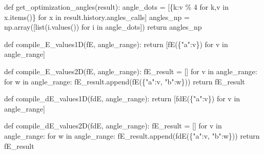 \documentclass[
  letterpaper,
  DIV=11,
  numbers=noendperiod]{scrartcl}
\newenvironment{Shaded}{\begin{snugshade}}{\end{snugshade}}
\newcommand{\BuiltInTok}[1]{\textcolor[rgb]{0.00,0.23,0.31}{#1}}
\newcommand{\ControlFlowTok}[1]{\textcolor[rgb]{0.00,0.23,0.31}{#1}}
\newcommand{\DecValTok}[1]{\textcolor[rgb]{0.68,0.00,0.00}{#1}}
\newcommand{\KeywordTok}[1]{\textcolor[rgb]{0.00,0.23,0.31}{#1}}
\newcommand{\NormalTok}[1]{\textcolor[rgb]{0.00,0.23,0.31}{#1}}
\newcommand{\OperatorTok}[1]{\textcolor[rgb]{0.37,0.37,0.37}{#1}}
\newcommand{\StringTok}[1]{\textcolor[rgb]{0.13,0.47,0.30}{#1}}
\begin{document}
\begin{Shaded}
\begin{Highlighting}[]
    \KeywordTok{def}\NormalTok{ get\_optimization\_angles(result):}
\NormalTok{        angle\_dots }\OperatorTok{=}\NormalTok{ [\{k:v }\OperatorTok{\%} \DecValTok{4} \ControlFlowTok{for}\NormalTok{ k,v }\KeywordTok{in}\NormalTok{ x.items()\} }\ControlFlowTok{for}\NormalTok{ x }\KeywordTok{in}\NormalTok{ result.history.angles\_calls]}
\NormalTok{        angles\_np }\OperatorTok{=}\NormalTok{ np.array([}\BuiltInTok{list}\NormalTok{(i.values()) }\ControlFlowTok{for}\NormalTok{ i }\KeywordTok{in}\NormalTok{ angle\_dots])}
        \ControlFlowTok{return}\NormalTok{ angles\_np}
    
    \KeywordTok{def}\NormalTok{ compile\_E\_values1D(fE, angle\_range):}
        \ControlFlowTok{return}\NormalTok{ [fE(\{}\StringTok{"a"}\NormalTok{:v\}) }\ControlFlowTok{for}\NormalTok{ v }\KeywordTok{in}\NormalTok{ angle\_range]}
    
    \KeywordTok{def}\NormalTok{ compile\_E\_values2D(fE, angle\_range):}
\NormalTok{        fE\_result }\OperatorTok{=}\NormalTok{ []}
        \ControlFlowTok{for}\NormalTok{ v }\KeywordTok{in}\NormalTok{ angle\_range:}
            \ControlFlowTok{for}\NormalTok{ w }\KeywordTok{in}\NormalTok{ angle\_range:}
\NormalTok{                fE\_result.append(fE(\{}\StringTok{"a"}\NormalTok{:v, }\StringTok{"b"}\NormalTok{:w\}))}
                \ControlFlowTok{return}\NormalTok{ fE\_result}

    \KeywordTok{def}\NormalTok{ compile\_dE\_values1D(fdE, angle\_range):}
        \ControlFlowTok{return}\NormalTok{ [fdE(\{}\StringTok{"a"}\NormalTok{:v\}) }\ControlFlowTok{for}\NormalTok{ v }\KeywordTok{in}\NormalTok{ angle\_range]}
    
    \KeywordTok{def}\NormalTok{ compile\_dE\_values2D(fdE, angle\_range):}
\NormalTok{        fE\_result }\OperatorTok{=}\NormalTok{ []}
        \ControlFlowTok{for}\NormalTok{ v }\KeywordTok{in}\NormalTok{ angle\_range:}
            \ControlFlowTok{for}\NormalTok{ w }\KeywordTok{in}\NormalTok{ angle\_range:}
\NormalTok{                fE\_result.append(fdE(\{}\StringTok{"a"}\NormalTok{:v, }\StringTok{"b"}\NormalTok{:w\}))}
                \ControlFlowTok{return}\NormalTok{ fE\_result}
    

\end{Highlighting}
\end{Shaded}
\end{document}
